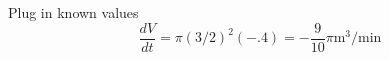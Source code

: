 \documentclass{ximera}
\begin{document}
\begin{exercise}
\begin{hint}
Plug in known values
\[\frac{dV}{dt} = \pi (3/2)^2 (-.4) = -\frac{9}{10}\pi \mbox{m}^3/\mbox{min}\]
\end{hint}


\begin{multipleChoice}
\end{multipleChoice}

\end{exercise}
\end{document}
